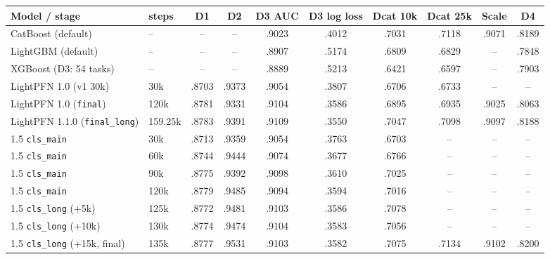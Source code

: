\begin{tabular}{llcccccccc}
\toprule
Model / stage & steps & D1 & D2 & D3 AUC & D3 log loss & Dcat 10k & Dcat 25k & Scale & D4 \\
\midrule
CatBoost (default) & -- & -- & -- & .9023 & .4012 & .7031 & .7118 & .9071 & .8189 \\
LightGBM (default) & -- & -- & -- & .8907 & .5174 & .6809 & .6829 & -- & .7848 \\
XGBoost (D3: 54 tasks) & -- & -- & -- & .8889 & .5213 & .6421 & .6597 & -- & .7903 \\
\midrule
LightPFN 1.0 (v1 30k) & 30k & .8703 & .9373 & .9054 & .3807 & .6706 & .6733 & -- & -- \\
LightPFN 1.0 (\texttt{final}) & 120k & .8781 & .9331 & .9104 & .3586 & .6895 & .6935 & .9025 & .8063 \\
LightPFN 1.1.0 (\texttt{final\_long}) & 159.25k & .8783 & .9391 & .9109 & .3550 & .7047 & .7098 & .9097 & .8188 \\
\midrule
1.5 \texttt{cls\_main} & 30k & .8713 & .9359 & .9054 & .3763 & .6703 & -- & -- & -- \\
1.5 \texttt{cls\_main} & 60k & .8744 & .9444 & .9074 & .3677 & .6766 & -- & -- & -- \\
1.5 \texttt{cls\_main} & 90k & .8775 & .9392 & .9098 & .3610 & .7025 & -- & -- & -- \\
1.5 \texttt{cls\_main} & 120k & .8779 & .9485 & .9094 & .3594 & .7016 & -- & -- & -- \\
1.5 \texttt{cls\_long} (+5k) & 125k & .8772 & .9481 & .9103 & .3586 & .7078 & -- & -- & -- \\
1.5 \texttt{cls\_long} (+10k) & 130k & .8774 & .9474 & .9104 & .3583 & .7056 & -- & -- & -- \\
\rowcolor{orange!12}
1.5 \texttt{cls\_long} (+15k, final) & 135k & .8777 & .9531 & .9103 & .3582 & .7075 & .7134 & .9102 & .8200 \\
\bottomrule
\end{tabular}
